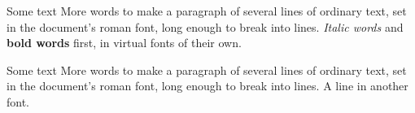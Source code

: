 \documentclass{article}
\begin{document}
 Some text\linebreak
More words to make a paragraph of several lines of ordinary text, set
in the document's roman font, long enough to break into lines.
\newpage
\textit{Italic words} and \textbf{bold words} first, in virtual fonts of their own.

 Some text\linebreak
More words to make a paragraph of several lines of ordinary text, set
in the document's roman font, long enough to break into lines.
\newpage
{ A line in another font.}
\end{document}
